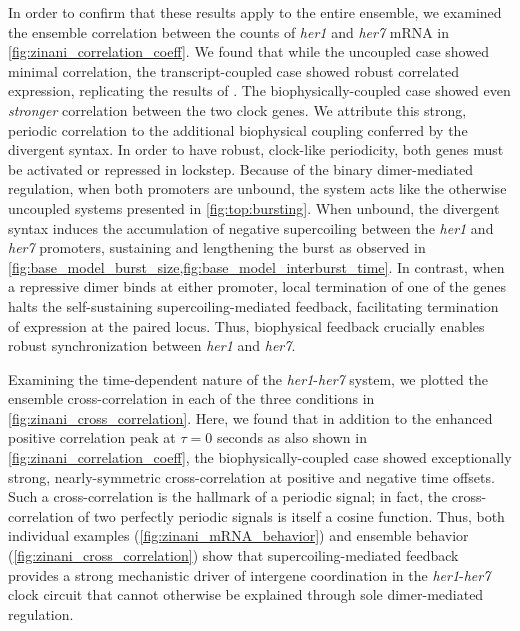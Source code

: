 \documentclass[11pt]{article}
\begin{document}
In order to confirm that these results apply to the entire ensemble, we examined the ensemble correlation between the counts of \textit{her1} and \textit{her7} mRNA in \cref{fig:zinani_correlation_coeff}. We found that while the uncoupled case showed minimal correlation, the transcript-coupled case showed robust correlated expression, replicating the results of \parencite{zinaniPairingSegmentationClock2021}. The biophysically-coupled case showed even \emph{stronger} correlation between the two clock genes. We attribute this strong, periodic correlation to the additional biophysical coupling conferred by the divergent syntax.
In order to have robust, clock-like periodicity, both genes must be activated or repressed in lockstep. Because of the binary dimer-mediated regulation, when both promoters are unbound, the system acts like the otherwise uncoupled systems presented in \cref{fig:top:bursting}. When unbound, the divergent syntax induces the accumulation of negative supercoiling between the \textit{her1} and \textit{her7} promoters, sustaining and lengthening the burst as observed in \cref{fig:base_model_burst_size,fig:base_model_interburst_time}.
In contrast, when a repressive dimer binds at either promoter, local termination of one of the genes halts the self-sustaining supercoiling-mediated feedback, facilitating termination of expression at the paired locus. Thus, biophysical feedback crucially enables robust synchronization between \textit{her1} and \textit{her7}.

Examining the time-dependent nature of the \textit{her1}-\textit{her7} system, we plotted the ensemble cross-correlation in each of the three conditions in \cref{fig:zinani_cross_correlation}. Here, we found that in addition to the enhanced positive correlation peak at \(\tau = 0\) seconds as also shown in \cref{fig:zinani_correlation_coeff}, the biophysically-coupled case showed exceptionally strong, nearly-symmetric cross-correlation at positive and negative time offsets. Such a cross-correlation is the hallmark of a periodic signal; in fact, the cross-correlation of two perfectly periodic signals is itself a cosine function. Thus, both individual examples (\cref{fig:zinani_mRNA_behavior}) and ensemble behavior (\cref{fig:zinani_cross_correlation}) show that supercoiling-mediated feedback provides a strong mechanistic driver of intergene coordination in the \textit{her1}-\textit{her7} clock circuit that cannot otherwise be explained through sole dimer-mediated regulation.
\end{document}
